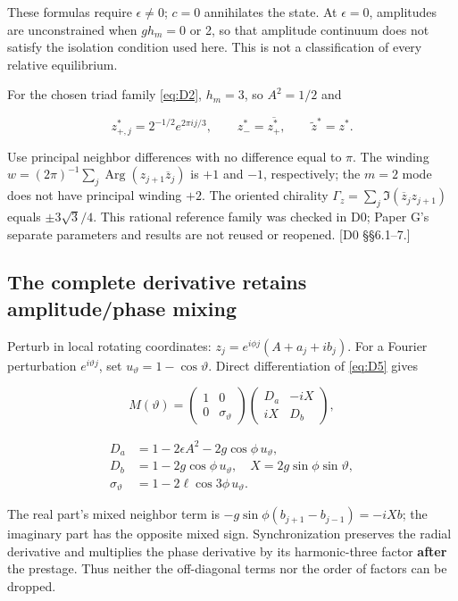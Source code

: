 \documentclass[11pt,a4paper]{article}
\begin{document}
These formulas require \(\epsilon\ne0\); \(c=0\) annihilates the state. At \(\epsilon=0\), amplitudes are unconstrained when \(gh_m=0\) or 2, so that amplitude continuum does not satisfy the isolation condition used here. This is not a classification of every relative equilibrium.

For the chosen triad family \eqref{eq:D2}, \(h_m=3\), so \(A^2=1/2\) and

\[
\boxed{z^*_{+,j}=2^{-1/2}e^{2\pi i j/3}},\qquad
z^*_-=\overline{z^*_+},\qquad \widetilde z^*=z^* .
\tag{D20}\label{eq:D20}
\]

Use principal neighbor differences with no difference equal to \(\pi\). The winding
\(w=(2\pi)^{-1}\sum_j\operatorname{Arg}(z_{j+1}\overline z_j)\)
is \(+1\) and \(-1\), respectively; the \(m=2\) mode does not have principal winding \(+2\). The oriented chirality
\(\Gamma_z=\sum_j\Im(\overline z_jz_{j+1})\)
equals \(\pm3\sqrt3/4\). This rational reference family was checked in D0; Paper G's separate parameters and results are not reused or reopened. [D0 \S{}\S{}6.1--7.]

\subsection{The complete derivative retains amplitude/\allowbreak{}phase mixing}

Perturb in local rotating coordinates:
\(z_j=e^{i\phi j}(A+a_j+ib_j)\).
For a Fourier perturbation \(e^{i\vartheta j}\), set \(u_\vartheta=1-\cos\vartheta\). Direct differentiation of \eqref{eq:D5} gives

\[
M(\vartheta)=
\begin{pmatrix}1&0\\0&\sigma_\vartheta\end{pmatrix}
\begin{pmatrix}D_a&-iX\\iX&D_b\end{pmatrix},
\tag{D21}\label{eq:D21}
\]

\[
\begin{aligned}
D_a&=1-2\epsilon A^2-2g\cos\phi\,u_\vartheta,\\
D_b&=1-2g\cos\phi\,u_\vartheta,\quad
X=2g\sin\phi\sin\vartheta,\\
\sigma_\vartheta&=1-2\ell\cos3\phi\,u_\vartheta .
\end{aligned}
\]

The real part's mixed neighbor term is
\(-g\sin\phi(b_{j+1}-b_{j-1})=-iXb\); the imaginary part has the opposite mixed sign. Synchronization preserves the radial derivative and multiplies the phase derivative by its harmonic-three factor \textbf{after} the prestage. Thus neither the off-diagonal terms nor the order of factors can be dropped.
\end{document}
